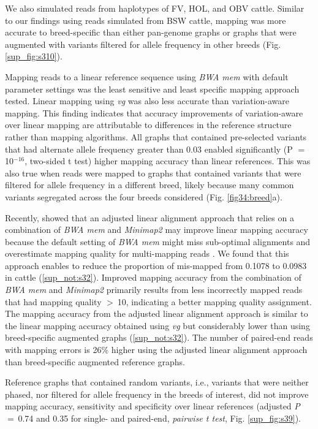 \documentclass[../main.tex]{subfiles}
\begin{document}
We also simulated reads from haplotypes of FV, HOL, and OBV cattle. Similar to our findings using reads simulated from BSW cattle, mapping was more accurate to breed-specific than either pan-genome graphs or graphs that were augmented with variants filtered for allele frequency in other breeds (Fig. \ref{sup_fig:s310}).

Mapping reads to a linear reference sequence using \emph{BWA mem} with default parameter settings was the least sensitive and least specific mapping approach tested. Linear mapping using \emph{vg} was also less accurate than variation-aware mapping. This finding indicates that accuracy improvements of variation-aware over linear mapping are attributable to differences in the reference structure rather than mapping algorithms. All graphs that contained pre-selected variants that had alternate allele frequency greater than 0.03 enabled significantly (P $=$ 10$^{−16}$, two-sided t test) higher mapping accuracy than linear references. This was also true when reads were mapped to graphs that contained variants that were filtered for allele frequency in a different breed, likely because many common variants segregated across the four breeds considered (Fig. \ref{fig34:breed}a).

Recently, \citep{grytten2020assessing} showed that an adjusted linear alignment approach that relies on a combination of \emph{BWA mem} and \emph{Minimap2} \citep{li2018minimap2} may improve linear mapping accuracy because the default setting of \emph{BWA mem} might miss sub-optimal alignments and overestimate mapping quality for multi-mapping reads \citep{grytten2020assessing,li2013aligning}. We found that this approach enables to reduce the proportion of mis-mapped from 0.1078 to 0.0983 in cattle (\ref{sup_not:s32}). Improved mapping accuracy from the combination of \emph{BWA mem} and \emph{Minimap2} primarily results from less incorrectly mapped reads that had mapping quality $>$ 10, indicating a better mapping quality assignment. The mapping accuracy from the adjusted linear alignment approach is similar to the linear mapping accuracy obtained using \emph{vg} but considerably lower than using breed-specific augmented graphs (\ref{sup_not:s32}). The number of paired-end reads with mapping errors is 26\% higher using the adjusted linear alignment approach than breed-specific augmented reference graphs.

Reference graphs that contained random variants, i.e., variants that were neither phased, nor filtered for allele frequency in the breeds of interest, did not improve mapping accuracy, sensitivity and specificity over linear references (adjusted \emph{P} $=$ 0.74 and 0.35 for single- and paired-end, \emph{pairwise t test}, Fig. \ref{sup_fig:s39}).
\end{document}
